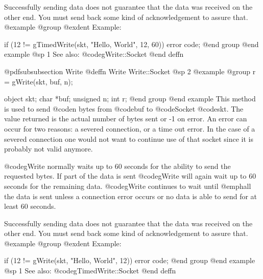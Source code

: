Successfully sending data does not guarantee that the data was received
on the other end.  You must send back some kind of acknowledgement to
assure that.
@example
@group
@exdent Example:
 
if (12 != gTimedWrite(skt, "Hello, World", 12, 60))
        error code;
@end group
@end example
@sp 1
See also:  @code{gWrite::Socket}
@end deffn















@pdfsubsubsection {Write}
@deffn {Write} Write::Socket
@sp 2
@example
@group
r = gWrite(skt, buf, n);

object   skt;
char     *buf;
unsigned n;
int      r;
@end group
@end example
This method is used to send @code{n} bytes from @code{buf} to
@code{Socket} @code{skt}.  The value returned is the actual number
of bytes sent or -1 on error.  An error can occur for two reasons:
a severed connection, or a time out error.  In the case of a severed
connection one would not want to continue use of that socket since
it is probably not valid anymore.

@code{gWrite} normally waits up to 60 seconds for the ability to send the
requested bytes.  If part of the data is sent @code{gWrite} will again
wait up to 60 seconds for the remaining data.  @code{gWrite} continues to
wait until @emph{all} the data is sent unless a connection error occurs
or no data is able to send for at least 60 seconds.

Successfully sending data does not guarantee that the data was received
on the other end.  You must send back some kind of acknowledgement to
assure that.
@example
@group
@exdent Example:
 
if (12 != gWrite(skt, "Hello, World", 12))
        error code;
@end group
@end example
@sp 1
See also:  @code{gTimedWrite::Socket}
@end deffn










